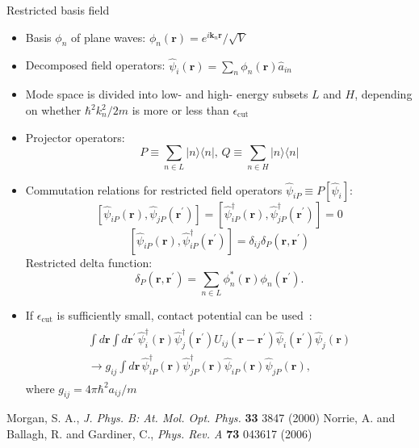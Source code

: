 \documentclass[final,hyperref={pdfpagelabels=false}]{beamer}
\begin{document}
\begin{frame}
\begin{columns}
{\begin{block}{Restricted basis field}
\begin{itemize}
	\item Basis $\phi_{n}$ of plane waves: $\phi_{n}(\mathbf{r}) = e^{i \mathbf{k}_n \mathbf{r}} / \sqrt{V}$
	\item Decomposed field operators: $\hat{\psi}_i(\mathbf{r}) = \sum\limits_n \phi_{n}(\mathbf{r}) \hat{a}_{in}$
	\item Mode space is divided into low- and high- energy subsets $L$ and $H$,
		depending on whether $\hbar^2 k_n^2 / 2 m $ is more or less than $\epsilon_{\textrm{cut}}$~\cite{norrie}
	\item Projector operators:	
\[ P \equiv \sum\limits_{n \in L} \lvert n \rangle \langle n \rvert,\,
Q \equiv \sum\limits_{n \in H} \lvert n \rangle \langle n \rvert \]
	\item Commutation relations for restricted field operators $\hat{\psi}_{iP} \equiv P[\hat{\psi}_i]$:
\[
\left[ \hat{\psi}_{iP}(\mathbf{r}), \hat{\psi}_{jP}(\mathbf{r}^\prime) \right] =
\left[ \hat{\psi}_{iP}^\dagger(\mathbf{r}), \hat{\psi}_{jP}^\dagger(\mathbf{r}^\prime) \right] = 0
\]
\[
\left[ \hat{\psi}_{iP}(\mathbf{r}), \hat{\psi}_{iP}^\dagger(\mathbf{r}^\prime) \right] = \delta_{ij} \delta_{P}(\mathbf{r}, \mathbf{r}^\prime)
\]
	Restricted delta function:
\[
\delta_{P}(\mathbf{r}, \mathbf{r}^\prime) = \sum\limits_{n \in L} \phi_{n}^* (\mathbf{r}) \phi_{n} (\mathbf{r}^\prime).
\]
	\item If $\epsilon_{\textrm{cut}}$ is sufficiently small, contact potential can be used~\cite{morgan}:
\begin{align*}
\begin{split}
\int d\mathbf{r} \int d\mathbf{r}^\prime \,
	\hat{\psi}_i^\dagger (\mathbf{r}) \hat{\psi}_j^\dagger (\mathbf{r}^\prime)
	U_{ij}(\mathbf{r} - \mathbf{r}^\prime)
	\hat{\psi}_i(\mathbf{r}^\prime) \hat{\psi}_j(\mathbf{r}) \\
\rightarrow g_{ij} \int d\mathbf{r} \,
	\hat{\psi}_{iP}^\dagger (\mathbf{r}) \hat{\psi}_{jP}^\dagger (\mathbf{r})
	\hat{\psi}_{iP}(\mathbf{r}) \hat{\psi}_{jP}(\mathbf{r}),
\end{split}
\end{align*}
	where $g_{ij} = 4 \pi \hbar^2 a_{ij} / m$

\end{itemize}

\tiny{ \begin{thebibliography}{9}
	 Morgan, S. A., \textit{J. Phys. B: At. Mol. Opt. Phys.} \textbf{33} 3847 (2000)
	 Norrie, A. and Ballagh, R. and Gardiner, C., \textit{Phys. Rev. A} \textbf{73} 043617 (2006)
\end{thebibliography} }


\end{block}}
\end{columns}
\end{frame}
\end{document}
